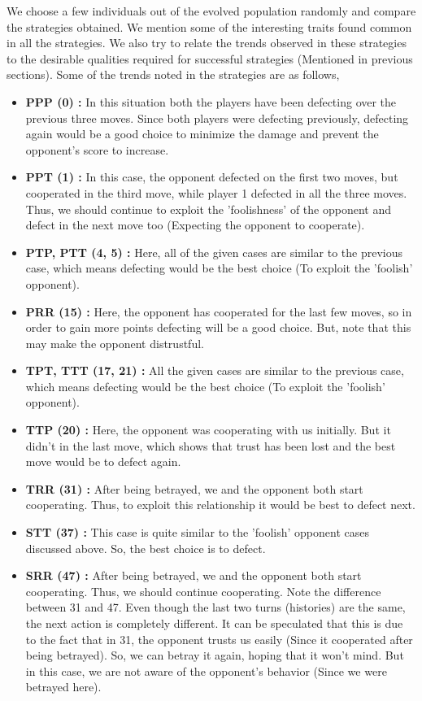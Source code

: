 \documentclass[a4paper]{article}
\begin{document}
	We choose a few individuals out of the evolved population randomly and compare the strategies obtained. We mention some of the interesting traits found common in all the strategies. We also try to relate the trends observed in these strategies to the desirable qualities required for successful strategies (Mentioned in previous sections). Some of the trends noted in the strategies are as follows,
	\begin{itemize}
	\item \textbf{PPP (0) :} In this situation both the players have been defecting over the previous three moves. Since both players were defecting previously, defecting again would be a good choice to minimize the damage and prevent the opponent's score to increase.
	\item \textbf{PPT (1) :} In this case, the opponent defected on the first two moves, but cooperated in the third move, while player 1 defected in all the three moves. Thus, we should continue to exploit the 'foolishness' of the opponent and defect in the next move too (Expecting the opponent to cooperate).
	\item \textbf{PTP, PTT (4, 5) :} Here, all of the given cases are similar to the previous case, which means defecting would be the best choice (To exploit the 'foolish' opponent).
	\item \textbf{PRR (15) :} Here, the opponent has cooperated for the last few moves, so in order to gain more points defecting will be a good choice. But, note that this may make the opponent distrustful.
	\item \textbf{TPT, TTT (17, 21) :} All the given cases are similar to the previous case, which means defecting would be the best choice (To exploit the 'foolish' opponent).
	\item \textbf{TTP (20) :} Here, the opponent was cooperating with us initially. But it didn't in the last move, which shows that trust has been lost and the best move would be to defect again.
	\item \textbf{TRR (31) :} After being betrayed, we and the opponent both start cooperating. Thus, to exploit this relationship it would be best to defect next.
	\item \textbf{STT (37) :} This case is quite similar to the 'foolish' opponent cases discussed above. So, the best choice is to defect.
	\item \textbf{SRR (47) :} After being betrayed, we and the opponent both start cooperating. Thus, we should continue cooperating. Note the difference between 31 and 47. Even though the last two turns (histories) are the same, the next action is completely different. It can be speculated that this is due to the fact that in 31, the opponent trusts us easily (Since it cooperated after being betrayed). So, we can betray it again, hoping that it won't mind. But in this case, we are not aware of the opponent's behavior (Since we were betrayed here).

\end{itemize}
\end{document}
